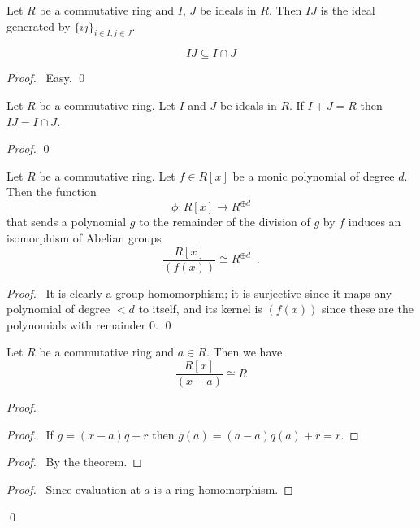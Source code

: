 \begin{df}
Let $R$ be a commutative ring and $I$, $J$ be ideals in $R$. Then $IJ$ is the ideal generated by $\{ ij \}_{i \in I, j \in J}$.
\end{df}

\begin{prop}
\[ IJ \subseteq I \cap J \]
\end{prop}

\begin{proof}
\pf\ Easy. \qed
\end{proof}

\begin{prop}
Let $R$ be a commutative ring. Let $I$ and $J$ be ideals in $R$. If $I + J = R$ then $IJ = I \cap J$.
\end{prop}

\begin{proof}
\pf
{}
\qed
\end{proof}

\begin{prop}
Let $R$ be a commutative ring. Let $f \in R[x]$ be a monic polynomial of degree $d$. Then the function
\[ \phi : R[x] \rightarrow R^{\oplus d} \]
that sends a polynomial $g$ to the remainder of the division of $g$ by $f$ induces an isomorphism of Abelian groups
\[ \frac{R[x]}{(f(x))} \cong R^{\oplus d} \enspace . \]
\end{prop}

\begin{proof}
\pf\ It is clearly a group homomorphism; it is surjective since it maps any polynomial of degree $< d$ to itself, and its kernel is $(f(x))$ since these are the polynomials with remainder 0. \qed
\end{proof}

\begin{cor}
Let $R$ be a commutative ring and $a \in R$. Then we have
\[ \frac{R[x]}{(x-a)} \cong R \]
\end{cor}

\begin{proof}
\pf
{}
\begin{proof}
\pf\ If $g = (x-a)q + r$ then $g(a) = (a-a)q(a) + r = r$.
\end{proof}
\begin{proof}
\pf\ By the theorem.
\end{proof}
\begin{proof}
\pf\ Since evaluation at $a$ is a ring homomorphism.
\end{proof}
\qed
\end{proof}


